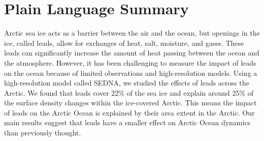 \documentclass[draft]{agujournal2019}
\begin{document}
%
%

%
%


\begin{abstract}
      The Arctic sea ice, in particular the ice pack, acts as an insulator between the atmosphere and the ocean. Leads, commonly found in the Arctic, facilitate ocean-atmosphere flux exchanges. Local observations have captured heat fluxes through some leads one order of magnitude larger than those outside of the leads, leading to the speculation that air-sea exchanges through leads contribute significantly to the Arctic Ocean surface buoyancy forcing. %
      Here, we quantify the magnitude and impact on the ocean surface of the leads using SEDNA, a subkilometer pan-Arctic hindcast. Leads account for 22\% of the sea ice cover surface, and within them, there is approximately 25\% of the total surface water mass transformation. In other words, the water mass transformation in leads is similar to those underneath the surrounding ice-covered oceans. Thus, the present estimate indicates that leads have a small contribution to Arctic Ocean dynamics, contrary to previous hypotheses.
\end{abstract}

\section*{Plain Language Summary}
Arctic sea ice acts as a barrier between the air and the ocean, but openings in the ice, called leads, allow for exchanges of heat, salt, moisture, and gases. These leads can significantly increase the amount of heat passing between the ocean and the atmosphere. However, it has been challenging to measure the impact of leads on the ocean because of limited observations and high-resolution models. Using a high-resolution model called SEDNA, we studied the effects of leads across the Arctic. We found that leads cover 22\% of the sea ice and explain around 25\% of the surface density changes within the ice-covered Arctic. This means the impact of leads on the Arctic Ocean is explained by their area extent in the Arctic. Our main results suggest that leads have a smaller effect on Arctic Ocean dynamics than previously thought.
\end{document}
